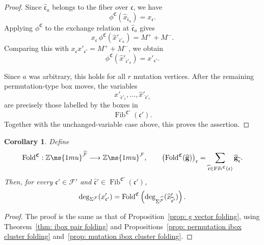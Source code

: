 \documentclass[12pt, leqno]{amsart}
\numberwithin{equation}{section}
\theoremstyle{plain}
\newtheorem{corollary}[lemma]{Corollary}
\theoremstyle{definition}
\newcommand{\Z}{\mathbb{Z}\ms{1mu}}
\newcommand{\Fold}{{\rm Fold}}
\newcommand{\Fib}{\operatorname{Fib}}
\newcommand{\hx}{\widehat{x}}
\newcommand{\frakC}{\mathfrak{C}}
\newcommand{\frakc}{\mathfrak{c}}
\newcommand{\hfrakc}{\widehat{\frakc}}
\newcommand{\hbfg}{\widehat{\bfg}}
\newcommand{\bfg}{\mathbf{g}}
\newcommand{\calF}{\mathcal{F}}
\newcommand{\hcalF}{{\widehat{\calF}}}
\begin{document}
\begin{proof}
Since $\hfrakc_a$ belongs to the fiber over $\frakc$, we have
\[
\phi^\frakC(\hx_{\hfrakc_a})=x_\frakc.
\]
Applying $\phi^\frakC$ to  the exchange relation at $\hfrakc_a$  gives
\[
x_\frakc\, \phi^\frakC(\hx'_{\hfrakc'_a}) = M^+ + M^-.
\]
Comparing this with $x_\frakc x'_{\frakc'}=M^+ + M^-$,
we obtain
\[
\phi^\frakC(\hx'_{\hfrakc'_a}) = x'_{\frakc'}.
\]

Since $a$ was arbitrary, this holds for all $r$ mutation vertices.
After the remaining permutation-type box moves, the variables
\[
\hx'_{\hfrakc'_1},\ldots,\hx'_{\hfrakc'_r}
\]
are precisely those labelled by the boxes in
\[
\Fib^{\frakC'}(\frakc').
\]
Together with the unchanged-variable case above, this proves the
assertion.
\end{proof}

\begin{corollary}\label{cor: ibox g-vector folding}
Define
\[
\Fold^{\frakC}:\Z^{\hcalF}\longrightarrow\Z^\calF,
\qquad
\bigl(\Fold^{\frakC}(\hbfg)\bigr)_{\frakc} = \sum_{\hfrakc\in\Fib^{\frakC}(\frakc)} \hbfg_{\hfrakc}.
\]
Then, for every $\frakc'\in\calF'$ and
$\hfrakc'\in\Fib^{\frakC'}(\frakc')$,
\[
\deg_{\Sigma^\calF}(x'_{\frakc'}) = \Fold^{\frakC}\left(\deg_{\Sigma^\hcalF}(\hx'_{\hfrakc'}) \right).
\]
\end{corollary}

\begin{proof}
The proof is the same as that of
Proposition~\ref{prop: g vector folding}, using
Theorem~\ref{thm: ibox pair folding} and
Propositions~\ref{prop: permutation ibox cluster folding}
and~\ref{prop: mutation ibox cluster folding}.
\end{proof}
\end{document}
